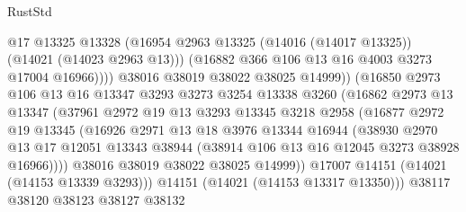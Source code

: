 \begin{lexlean}{RustStd}
\begin{coremodule}
                                @17
                                @13325
                                @13328
                                (@16954
                                  @2963
                                  @13325
                                  (@14016 (@14017 @13325))
                                  (@14021 (@14023 @2963 @13)))
                                (@16882 @366 @106 @13 @16 @4003 @3273 @17004 @16966))))
                          @38016
                          @38019
                          @38022
                          @38025
                          @14999))
                      (@16850
                        @2973
                        @106
                        @13
                        @16
                        @13347
                        @3293
                        @3273
                        @3254
                        @13338
                        @3260
                        (@16862
                          @2973
                          @13
                          @13347
                          (@37961
                            @2972
                            @19
                            @13
                            @3293
                            @13345
                            @3218
                            @2958
                            (@16877
                              @2972
                              @19
                              @13345
                              (@16926
                                @2971
                                @13
                                @18
                                @3976
                                @13344
                                @16944
                                (@38930
                                  @2970
                                  @13
                                  @17
                                  @12051
                                  @13343
                                  @38944
                                  (@38914 @106 @13 @16 @12045 @3273 @38928 @16966))))
                            @38016
                            @38019
                            @38022
                            @38025
                            @14999))
                        @17007
                        @14151
                        (@14021 (@14153 @13339 @3293)))
                      @14151
                      (@14021 (@14153 @13317 @13350)))
                    @38117
                    @38120
                    @38123
                    @38127
                    @38132

\end{coremodule}
\end{lexlean}
